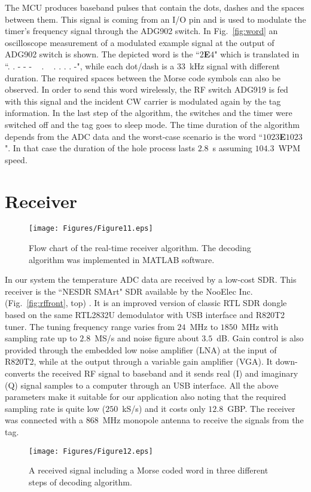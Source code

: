 \documentclass[journal]{IEEEtran}
\begin{document}
The MCU produces  baseband pulses that contain the dots, dashes  and  the spaces between them.
%
This signal is  coming  from  an  I/O  pin and is used to modulate the timer's frequency signal through the ADG902  switch.
%
In Fig.~\ref{fig:word} an oscilloscope  measurement of a modulated  example signal 
at  the  output of ADG902 switch  is shown.
%
%
The depicted word is the ``$2$\textbf{E}$4$" which is translated in ``. . - - - ~ . ~ . . . . -", while 
%
each dot/dash is a $33$~kHz signal with different duration.
%
The required spaces between the  Morse code symbols can also be observed.
%
%
In order to send this word wirelessly, the RF switch ADG919 is fed with this signal and the incident CW carrier is modulated again by the tag information. 
%
In the last step of the algorithm, the  switches and the timer  were switched off and the tag  goes to sleep mode.
%
The time duration of the algorithm depends from the ADC data and the  worst-case scenario is the word  ``$1023$\textbf{E}$1023$". 
%
In that case  the duration of the hole process lasts $2.8$~s assuming $104.3$~WPM speed.




\section{Receiver}
\label{sec:receiver}

\begin{figure}[t]
\centering
\texttt{[image: Figures/Figure11.eps]}
\caption{Flow chart of the real-time receiver algorithm. The decoding algorithm was implemented in MATLAB software.}
\label{fig:recalg}
\end{figure} 

In our system the  temperature  ADC data are received  by a low-cost SDR. 
%
This receiver is the   ``NESDR SMArt" SDR available by the NooElec   Inc. (Fig.~\ref{fig:rffront}, top) \cite{NESDR}.
%
It is an improved version of classic RTL SDR dongle based on the same
RTL2832U demodulator with USB interface and R820T2 tuner. 
%
The tuning frequency range varies  from $24$~MHz to $1850$~MHz with sampling rate up to
$2.8$~MS/s and noise figure about $3.5$~dB. 
%
Gain control is also provided through the embedded low noise amplifier (LNA)
at the input of R820T2, while  at the output through a variable gain amplifier (VGA). 
%
It  down-converts the received RF signal to baseband and it  sends real (I) and imaginary (Q) signal samples to a computer through an USB interface. 
%
All the above parameters  make it suitable for our application also noting that the required sampling rate is quite low ($250$~kS/s) and it costs only    $12.8$~GBP. 
%
The receiver  was connected with a $868$~MHz monopole antenna to receive the signals from the tag.
%
\begin{figure}[t]
\centering
\texttt{[image: Figures/Figure12.eps]}
\caption{A received signal including a Morse coded word in three different steps of decoding algorithm.}
\label{fig:recword}
\end{figure}
\end{document}
